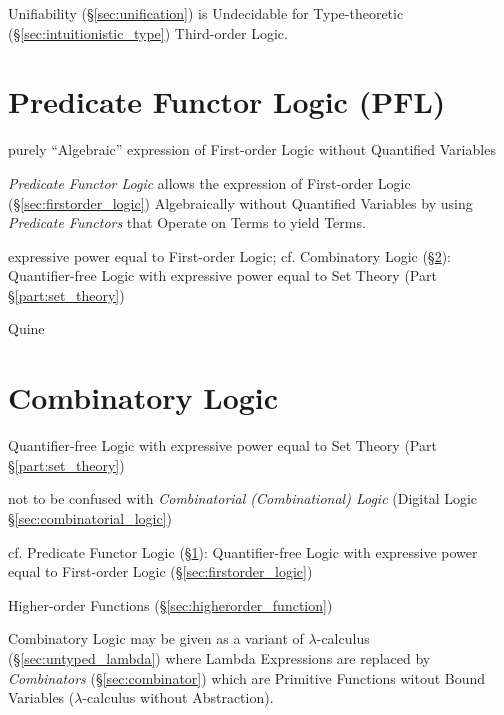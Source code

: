 Unifiability (\S\ref{sec:unification}) is Undecidable for
Type-theoretic (\S\ref{sec:intuitionistic_type}) Third-order Logic.



\section{Predicate Functor Logic (PFL)}\label{sec:pfl}


purely ``Algebraic'' expression of First-order Logic
without Quantified Variables

\emph{Predicate Functor Logic} allows the expression of First-order
Logic (\S\ref{sec:firstorder_logic}) Algebraically without Quantified
Variables by using \emph{Predicate Functors} that Operate on Terms to
yield Terms.

expressive power equal to First-order Logic; cf. Combinatory Logic
(\S\ref{sec:combinatory_logic}): Quantifier-free Logic with expressive power
equal to Set Theory (Part \S\ref{part:set_theory})

Quine



\section{Combinatory Logic}\label{sec:combinatory_logic}

Quantifier-free Logic with expressive power equal to Set Theory (Part
\S\ref{part:set_theory})

\fist not to be confused with \emph{Combinatorial (Combinational) Logic}
(Digital Logic \S\ref{sec:combinatorial_logic})

\fist cf. Predicate Functor Logic (\S\ref{sec:pfl}): Quantifier-free Logic with
expressive power equal to First-order Logic (\S\ref{sec:firstorder_logic})

Higher-order Functions (\S\ref{sec:higherorder_function})

Combinatory Logic may be given as a variant of $\lambda$-calculus
(\S\ref{sec:untyped_lambda}) where Lambda Expressions are replaced by
\emph{Combinators} (\S\ref{sec:combinator}) which are Primitive Functions witout
Bound Variables ($\lambda$-calculus without Abstraction).

